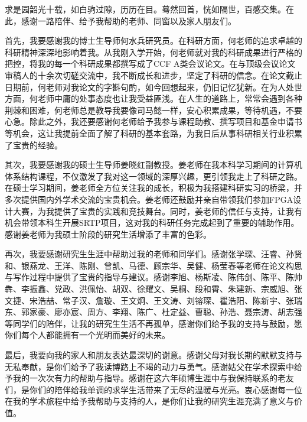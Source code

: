 \cleardoublepage
{}

求是园韶光十载，如白驹过隙，历历在目。蓦然回首，恍如隔世，百感交集。在此，感谢一路陪伴、给予我帮助的老师、同窗以及家人朋友们。

首先，我要感谢我的博士生导师何水兵研究员。在科研方面，何老师的追求卓越的科研精神深深地影响着我。从我刚入学开始，何老师就对我的科研成果进行严格的把控，将我的每一个科研成果都撰写成了CCF A类会议论文。在与顶级会议论文审稿人的十余次切磋交流中，我不断成长和进步，坚定了科研的信念。在论文截止日期前，何老师对我论文的字斟句酌，如今回想起来，仍旧记忆犹新。在为人处世方面，何老师中庸的处事态度也让我受益匪浅。在人生的道路上，常常会遇到各种荆棘和困难，何老师总是教导我要像司马懿一样，安心积累成果，等待机遇，不要心急。除此之外，我还要感谢何老师给予我参与课程助教、撰写项目和基金申请书等机会，这让我提前全面了解了科研的基本套路，为我日后从事科研相关行业积累了宝贵的经验。

其次，我要感谢我的硕士生导师姜晓红副教授。姜老师在我本科学习期间的计算机体系结构课程，不仅激发了我对这一领域的深厚兴趣，更引领我走上了科研之路。在硕士学习期间，姜老师全方位关注我的成长，积极为我搭建科研实习的桥梁，并多次提供国内外学术交流的宝贵机会。姜老师还鼓励并亲自带领我们参加FPGA设计大赛，为我提供了宝贵的实践和竞技舞台。同时，姜老师的信任与支持，让我有机会带领本科生开展SRTP项目，这对我的科研任务完成起到了重要的辅助作用。感谢姜老师为我硕士阶段的研究生活增添了丰富的色彩。

再次，我要感谢研究生生涯中帮助过我的老师和同学们。感谢张学琛、汪睿、孙贤和、银燕龙、王洋、陈刚、曾凯、马德、顾宗华、吴健、杨莹春等老师在论文构思与写作过程中提供了宝贵的指导与建议。感谢李旭、杨斯凌、陈伟剑、陈平、陈帅犇、李振鑫、党政、洪佩怡、胡双、徐耀文、吴桐、段和霄、朱建新、宗威旭、张文捷、宋浩喆、常子汉、詹璇、王文炯、王文涛、刘镕琛、瞿浩阳、陈新宇、张瑞东、郭家豪、廖亦宸、周方、李翔、陈广、杜定益、曹聪、孙浩、聂宗涛、胡志强等同学们的陪伴，让我的研究生生活不再孤单，感谢你们给予我的支持与鼓励，愿你们每个人都能拥有一个光明而美好的未来。

最后，我要向我的家人和朋友表达最深切的谢意。感谢父母对我长期的默默支持与无私奉献，是你们给予了我读博路上不竭的动力与勇气。感谢姑父在学术探索中给予我的一次次有力的帮助与指导。感谢在这六年硕博生涯中与我保持联系的老友们，是你们的陪伴给我单调的求学生活带来了无尽的温暖与光亮。衷心感谢每一位在我的学术旅程中给予我帮助与支持的人，是你们让我的研究生涯充满了意义与价值。